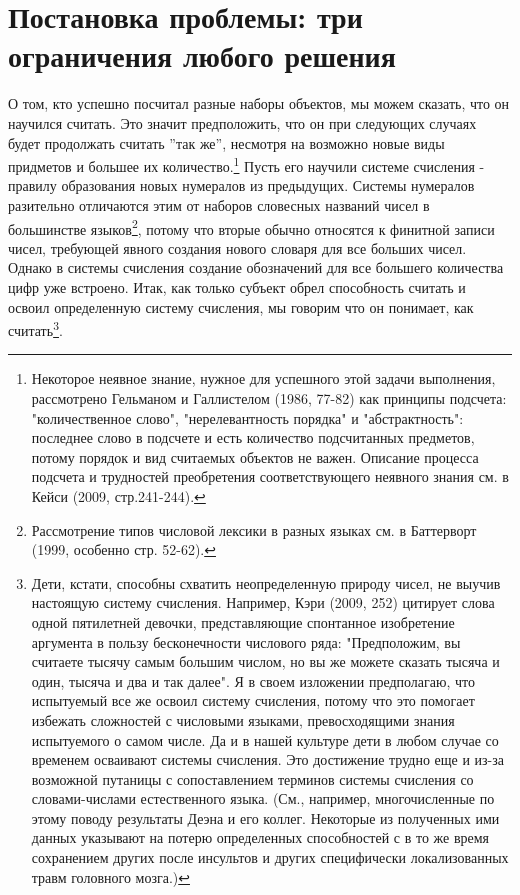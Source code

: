 \documentclass{book}
\begin{document}
\section{Постановка проблемы: три ограничения любого решения}

О том, кто успешно посчитал разные наборы объектов, мы можем сказать, что он научился считать. Это значит предположить, что он при следующих случаях будет продолжать считать ''так же'', несмотря на возможно новые виды придметов и большее их количество.\footnote{Некоторое неявное знание, нужное для успешного этой задачи выполнения, рассмотрено Гельманом и Галлистелом (1986, 77-82) как принципы подсчета: "количественное слово", "нерелевантность порядка" и "абстрактность": последнее слово в подсчете и есть количество подсчитанных предметов, потому порядок и вид считаемых объектов не важен. Описание процесса подсчета и трудностей преобретения соответствующего неявного знания см. в Кейси (2009, стр.241-244).} Пусть его научили системе счисления - правилу образования новых нумералов из предыдущих. Системы нумералов разительно отличаются этим от наборов словесных названий чисел в большинстве языков\footnote{Рассмотрение типов числовой лексики в разных языках см. в Баттерворт (1999, особенно стр. 52-62).}, потому что вторые обычно относятся к финитной записи чисел, требующей явного создания нового словаря для все больших чисел. Однако в системы счисления создание обозначений для все большего количества цифр уже встроено. Итак, как только субъект обрел способность считать и освоил определенную систему счисления, мы говорим что он понимает, как считать\footnote{Дети, кстати, способны схватить неопределенную природу чисел, не выучив настоящую систему счисления. Например, Кэри (2009, 252) цитирует слова одной пятилетней девочки, представляющие спонтанное изобретение аргумента в пользу бесконечности числового ряда: "Предположим, вы считаете тысячу самым большим числом, но вы же можете сказать тысяча и один, тысяча и два и так далее". Я в своем изложении предполагаю, что испытуемый все же освоил систему счисления, потому что это помогает избежать сложностей с числовыми языками, превосходящими знания испытуемого о самом числе. Да и в нашей культуре дети в любом случае со временем осваивают системы счисления. Это достижение трудно еще и из-за возможной путаницы с сопоставлением терминов системы счисления со словами-числами естественного языка. (См., например, многочисленные по этому поводу результаты Деэна и его коллег. Некоторые из полученных ими данных указывают на потерю определенных способностей с в то же время сохранением других после инсультов и других специфически локализованных травм головного мозга.)}.
\end{document}
